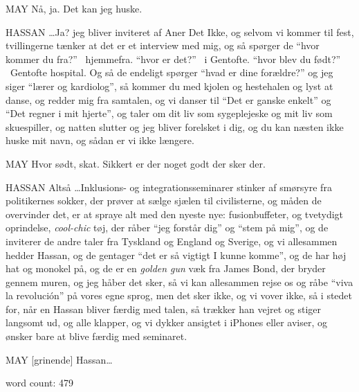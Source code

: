 \documentclass{article}
\begin{document}
MAY Nå, ja. Det kan jeg huske.

HASSAN \ldots Ja? jeg bliver inviteret af Aner Det Ikke, og selvom vi kommer til fest, tvillingerne tænker at det er et interview med mig, og så spørger de ``hvor kommer du fra?'' \textendash\  hjemmefra. ``hvor er det?'' \textendash\ i Gentofte. ``hvor blev du født?'' \textendash\ Gentofte hospital. Og så de endeligt spørger ``hvad er dine forældre?'' og jeg siger ``lærer og kardiolog'', så kommer du med kjolen og hestehalen og lyst at danse, og redder mig fra samtalen,  og vi danser til ``Det er ganske enkelt'' og ``Det regner i mit hjerte'', og taler om dit liv som sygeplejeske og mit liv som skuespiller, og natten slutter og jeg bliver forelsket i dig, og du kan næsten ikke huske mit navn, og sådan er vi ikke længere.

MAY Hvor sødt, skat. Sikkert er der noget godt der sker der.

HASSAN Altså \ldots Inklusions- og integrationsseminarer stinker af smørsyre fra politikernes sokker, der prøver at sælge sjælen til civilisterne, og måden de overvinder det, er at spraye alt med den nyeste nye: fusionbuffeter, og tvetydigt oprindelse, \textit{cool-chic} tøj, der råber ``jeg forstår dig'' og ``stem på mig'', og de inviterer de andre taler fra Tyskland og England og Sverige, og vi allesammen hedder Hassan, og de gentager ``det er så vigtigt I kunne komme'', og de har høj hat og monokel på, og de er en \textit{golden gun} væk fra James Bond, der bryder gennem muren, og jeg håber det sker, så vi kan allesammen rejse os og råbe ``viva la revolución'' på vores egne sprog, men det sker ikke, og vi vover ikke, så i stedet for, når en Hassan bliver færdig med talen, så trækker han vejret og stiger langsomt ud, og alle klapper, og vi dykker ansigtet i iPhones eller aviser, og ønsker bare at blive færdig med seminaret.

MAY [grinende] Hassan\ldots

word count: 479

\nocite{Preisler2013BMB}

\end{document}
